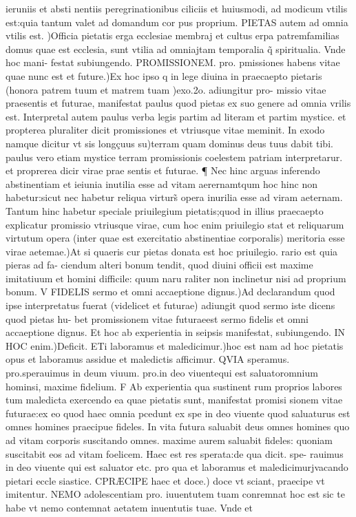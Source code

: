 \documentclass{article}
\begin{document}
\begin{pages}
ieruniis et absti nentiis peregrinationibus ciliciis et huiusmodi, ad modicum vtilis est:quia tantum valet ad domandum cor pus proprium. PIETAS autem ad omnia vtilis est. )Officia pietatis erga ecclesiae membraj et cultus erpa patremfamilias domus quae est ecclesia, sunt vtilia ad omniajtam temporalia q̃ spiritualia. Vnde hoc mani- festat subiungendo. PROMISSIONEM. pro. pmissiones habens vitae quae nunc est et future.)Ex hoc ipso q in lege diuina in praecaepto pietaris (honora patrem tuum et matrem tuam )exo.2o. adiungitur pro- missio vitae praesentis et futurae, manifestat paulus quod pietas ex suo genere ad omnia vrilis est. Interpretal autem paulus verba legis partim ad literam et partim mystice. et propterea pluraliter dicit promissiones et vtriusque vitae meminit. In exodo namque dicitur vt sis longçuus su)terram quam dominus deus tuus dabit tibi. paulus vero etiam mystice terram promissionis coelestem patriam interpretarur. et proprerea dicir virae prae sentis et futurae. ¶ Nec hinc arguas inferendo abstinentiam et ieiunia inutilia esse ad vitam aerernamtqum hoc hinc non habetur:sicut nec habetur reliqua virturs̃ opera inurilia esse ad viram aeternam. Tantum hinc habetur speciale priuilegium pietatis;quod in illius praecaepto explicatur promissio vtriusque virae, cum hoc enim priuilegio stat et reliquarum virtutum opera (inter quae est exercitatio abstinentiae corporalis) meritoria esse virae aetemae.)At si quaeris cur pietas donata est hoc priuilegio. rario est quia pieras ad fa- ciendum alteri bonum tendit, quod diuini officii est maxime imitatiuum et homini difficile: quum naru raliter non inclinetur nisi ad proprium bonum. V FIDELIS sermo et omni accaeptione dignus.)Ad declarandum quod ipse interpretatus fuerat (videlicet et futurae) adiungit quod sermo iste dicens quod pietas hu- bet promissionem vitae futuraeest sermo fidelis et omni accaeptione dignus. Et hoc ab experientia in seipsis manifestat, subiungendo. IN HOC enim.)Deficit. ETi laboramus et maledicimur.)hoc est nam ad hoc pietatis opus et laboramus assidue et maledictis afficimur. QVIA speramus. pro.sperauimus in deum viuum. pro.in deo viuentequi est saluatoromnium hominsi, maxime fidelium. F Ab experientia qua sustinent rum proprios labores tum maledicta exercendo ea quae pietatis sunt, manifestat promisi sionem vitae futurae:ex eo quod haec omnia pcedunt ex spe in deo viuente quod saluaturus est omnes homines praecipue fideles. In vita futura saluabit deus omnes homines quo ad vitam corporis suscitando omnes. maxime aurem saluabit fideles: quoniam suscitabit eos ad vitam foelicem. Haec est res sperata:de qua dicit. spe- rauimus in deo viuente qui est saluator etc. pro qua et laboramus et maledicimurjvacando pietari eccle siastice. CPRÆCIPE haec et doce.) doce vt sciant, praecipe vt imitentur. NEMO adolescentiam pro. iuuentutem tuam conremnat hoc est sic te habe vt nemo contemnat aetatem inuentutis tuae. Vnde et  \pend

\end{pages}
\end{document}
